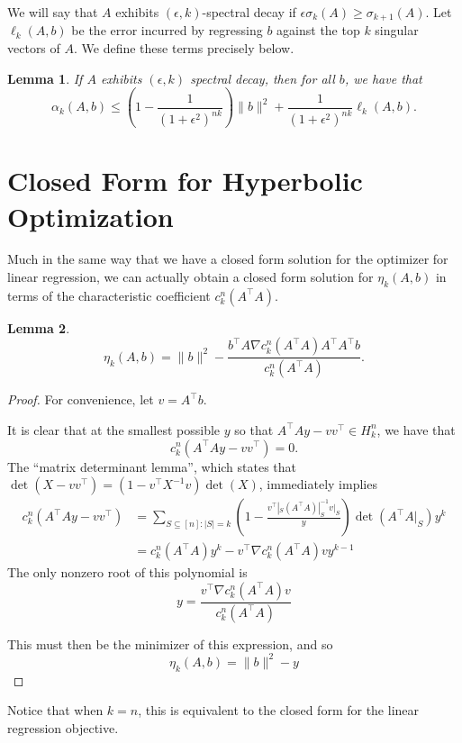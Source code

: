 \documentclass[a4paper]{article}
\newtheorem{lemma}{Lemma}
\begin{document}
We will say that $A$ exhibits $(\epsilon, k)$-spectral decay if $\epsilon \sigma_{k}(A) \ge \sigma_{k+1}(A)$.
Let $\ell_k(A,b)$ be the error incurred by regressing $b$ against the top $k$ singular vectors of $A$. We define these terms precisely below.

\begin{lemma}
    If $A$ exhibits $(\epsilon, k)$ spectral decay, then for all $b$, we have that 
    \[
        \alpha_k(A, b) \le (1-\frac{1}{(1+\epsilon^2)^{nk}}) \|b\|^2 + \frac{1}{(1+\epsilon^2)^{nk}}\ell_k(A, b).
    \]
\end{lemma}


\section{Closed Form for Hyperbolic Optimization}
Much in the same way that we have a closed form solution for the optimizer for linear regression, we can actually obtain a closed form solution for $\eta_k(A, b)$ in terms of the characteristic coefficient $c_k^n(A^{\intercal}A)$.
\begin{lemma}
    \[
        \eta_k(A, b) = \|b\|^2 - \frac{b^{\intercal} A\nabla c_k^n(A^{\intercal}A)A^{\intercal} A^{\intercal}b}{c_k^n(A^{\intercal}A)}.
    \]
\end{lemma}
\begin{proof}
    For convenience, let $v = A^{\intercal}b$.

    It is clear that at the smallest possible $y$ so that $A^{\intercal}Ay - vv^{\intercal} \in H^n_k$, we have that 
    \[
        c_k^n(A^{\intercal}Ay - vv^{\intercal}) = 0.
    \]
    The ``matrix determinant lemma'', which states that $\det(X - vv^{\intercal}) = (1-v^{\intercal}X^{-1}v)\det(X)$, immediately implies
    \begin{align*}
        c_k^n(A^{\intercal}Ay - vv^{\intercal}) &= \sum_{S \subseteq [n] : |S| = k}(1-\frac{v^{\intercal}|_S(A^{\intercal}A)|_S^{-1}v|_S}{y})\det(A^{\intercal}A|_S)y^k\\
                                              &= c_k^n(A^{\intercal}A)y^k - v^{\intercal}\nabla c_k^n(A^{\intercal}A) vy^{k-1}
    \end{align*}
    The only nonzero root of this polynomial is
    \[
        y = \frac{v^{\intercal}\nabla c_k^n(A^{\intercal}A) v}{c_k^n(A^{\intercal}A)}
    \]

    This must then be the minimizer of this expression, and so 
    \[
        \eta_k(A, b) = \|b\|^2 - y
    \]
\end{proof}
Notice that when $k = n$, this is equivalent to the closed form for the linear regression objective.
\end{document}
